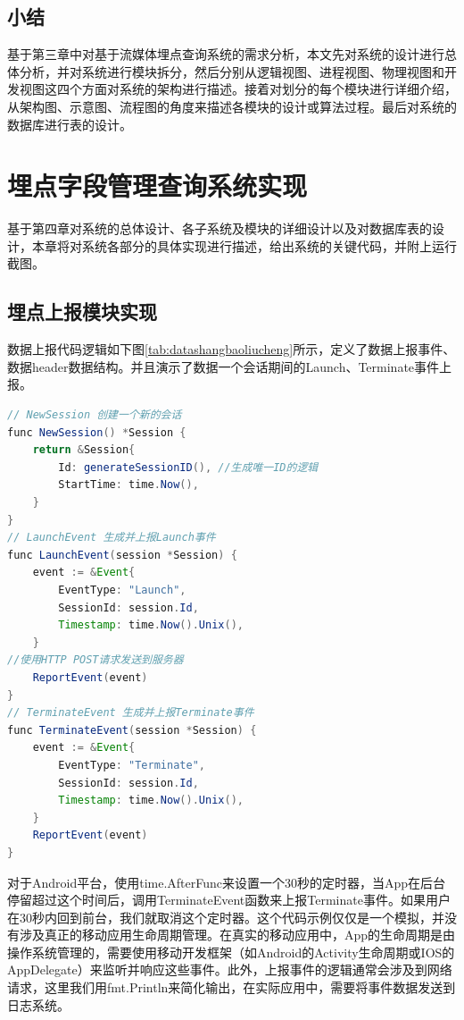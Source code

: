 \begin{longtable}[htbp]
\section{小结}
基于第三章中对基于流媒体埋点查询系统的需求分析，本文先对系统的设计进行总体分析，并对系统进行模块拆分，然后分别从逻辑视图、进程视图、物理视图和开发视图这四个方面对系统的架构进行描述。接着对划分的每个模块进行详细介绍，从架构图、示意图、流程图的角度来描述各模块的设计或算法过程。最后对系统的数据库进行表的设计。

\chapter{埋点字段管理查询系统实现}
基于第四章对系统的总体设计、各子系统及模块的详细设计以及对数据库表的设计，本章将对系统各部分的具体实现进行描述，给出系统的关键代码，并附上运行截图。
\section{埋点上报模块实现}
数据上报代码逻辑如下图\ref{tab:datashangbaoliucheng}所示，定义了数据上报事件、数据header数据结构。并且演示了数据一个会话期间的Launch、Terminate事件上报。
\begin{lrbox}{\datashangbaoliucheng}  
\begin{lstlisting}[language=Java]  
// NewSession 创建一个新的会话  
func NewSession() *Session {  
	return &Session{  
		Id: generateSessionID(), //生成唯一ID的逻辑
		StartTime: time.Now(),  
	}  
}    
// LaunchEvent 生成并上报Launch事件  
func LaunchEvent(session *Session) {  
	event := &Event{  
		EventType: "Launch",  
		SessionId: session.Id,  
		Timestamp: time.Now().Unix(),  
	}  
//使用HTTP POST请求发送到服务器
	ReportEvent(event)  
}  
// TerminateEvent 生成并上报Terminate事件  
func TerminateEvent(session *Session) {  
	event := &Event{  
		EventType: "Terminate",  
		SessionId: session.Id,  
		Timestamp: time.Now().Unix(),  
	}  
	ReportEvent(event)  
}  
\end{lstlisting}  
\end{lrbox} 
\begin{table}[h]   
\caption{数据上报时机流程}  
\label{tab:datashangbaoliucheng}  
\usebox{\datashangbaoliucheng}  
\end{table}  

对于Android平台，使用time.AfterFunc来设置一个30秒的定时器，当App在后台停留超过这个时间后，调用TerminateEvent函数来上报Terminate事件。如果用户在30秒内回到前台，我们就取消这个定时器。这个代码示例仅仅是一个模拟，并没有涉及真正的移动应用生命周期管理。在真实的移动应用中，App的生命周期是由操作系统管理的，需要使用移动开发框架（如Android的Activity生命周期或IOS的AppDelegate）来监听并响应这些事件。此外，上报事件的逻辑通常会涉及到网络请求，这里我们用fmt.Println来简化输出，在实际应用中，需要将事件数据发送到日志系统。


\end{longtable}

